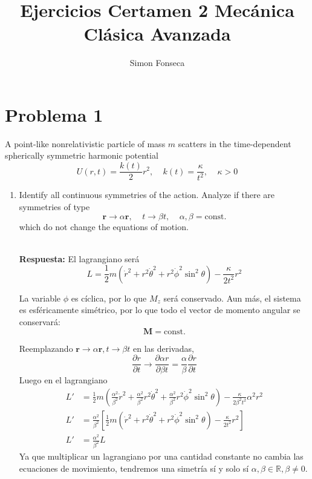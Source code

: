 \documentclass[]{article}
\title{Ejercicios Certamen 2 Mecánica Clásica Avanzada}
\author{Simon Fonseca}
\numberwithin{equation}{section}
\newcommand{\0}{\textcolor{gray}{0}}
\newcommand{\rv}{\mathbf{r}}
\newcommand{\pd}[2]{\dfrac{\partial #1}{\partial #2}}
\newcommand{\n}[1]{\mathbf{#1}}
\newcommand{\resp}{
	\\
	
	\textbf{Respuesta:} }
\begin{document}
\maketitle
\section{Problema 1}
A point-like nonrelativistic particle of mass $m$ scatters in the time-dependent spherically symmetric harmonic potential
\begin{equation}
	U(r,t) = \frac{k(t)}{2} r^2, ~~~~~ k(t) = \frac{\kappa}{t^2}, ~~~~~ \kappa > 0
\end{equation}
\begin{enumerate}	
	\item[(a)] Identify all continuous symmetries of the action. Analyze if there are symmetries of type
	\begin{equation}
		\rv \rightarrow \alpha \rv, ~~~~~ t\rightarrow \beta t, ~~~~~ \alpha,\beta=\mathrm{const.}
	\end{equation}
	which do not change the equations of motion.
	\resp El lagrangiano será
	\begin{equation}
		L = \frac{1}{2}m \left(\dot{r}^2 + r^2 \dot{\theta}^2 + r^2\dot{\phi}^2 \sin^2 \theta \right) - \frac{\kappa}{2 t^2} r^2
	\end{equation}
	
	La variable $\phi$ es cíclica, por lo que $M_z$ será conservado. Aun más, el sistema es esféricamente simétrico, por lo que todo el vector de momento angular se conservará:
	\begin{equation}
		\n{M} = \mathrm{const.}
	\end{equation}
	
	Reemplazando $\rv \rightarrow \alpha \rv, t\rightarrow \beta t$ en las derivadas,
	\begin{equation}
		\pd{r}{t} \rightarrow \pd{\alpha r}{\beta t} = \frac{\alpha}{\beta} \pd{r}{t}
	\end{equation}
	Luego en el lagrangiano
	\begin{align*}
		L' &= \frac{1}{2}m \left(\frac{\alpha^2}{\beta^2} \dot{r}^2 + \frac{\alpha^2}{\beta^2} r^2 \dot{\theta}^2 + \frac{\alpha^2}{\beta^2} r^2\dot{\phi}^2 \sin^2 \theta \right) - \frac{\kappa}{2 \beta^2 t^2} \alpha^2 r^2\\
		L' &= \frac{\alpha^2}{\beta^2} \left[\frac{1}{2}m \left(\dot{r}^2 + r^2 \dot{\theta}^2 + r^2\dot{\phi}^2 \sin^2 \theta \right) - \frac{\kappa}{2 t^2} r^2\right]\\
		L' &= \frac{\alpha^2}{\beta^2} L
	\end{align*}
	Ya que multiplicar un lagrangiano por una cantidad constante no cambia las ecuaciones de movimiento, tendremos una simetría sí y solo sí $\alpha,\beta \in \mathbb{R}, \beta\neq 0$.
	

\end{enumerate}
\end{document}
